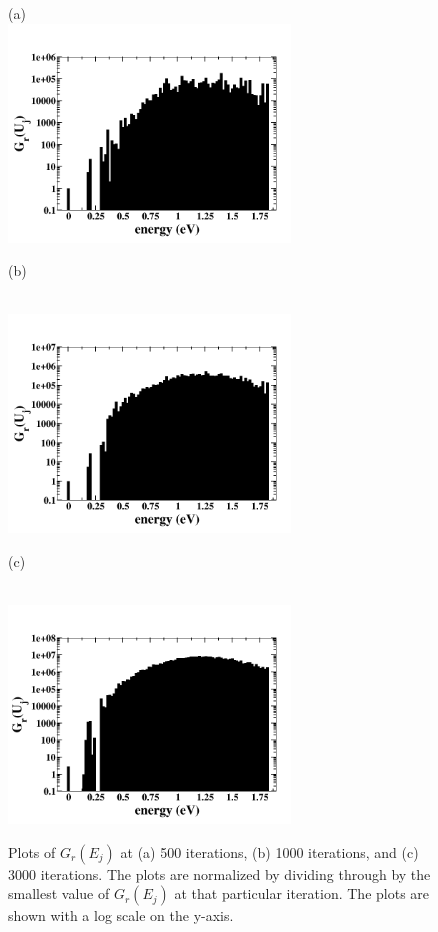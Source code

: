 \documentclass[aps,prl,reprint,superscriptaddress,showkeys]{revtex4-1}
\begin{document}
\begin{figure}[h!]
(a)\\
\includegraphics[width=7.5cm]{./figures/GE_fig_500.png}
\centerline{(b)}\\
\includegraphics[width=7.5cm]{./figures/GE_fig_1000.png}
\centerline{(c)}\\
\includegraphics[width=7.5cm]{./figures/GE_fig_3000.png}
\caption{Plots of $G_r(E_j)$ at (a) 500 iterations, (b) 1000 iterations, and (c) 3000 iterations. The plots are normalized by dividing through by the smallest value of $G_r(E_j)$ at that particular iteration. The plots are shown with a log scale on the y-axis.  \label{converge_GE}}
\end{figure}
\end{document}
